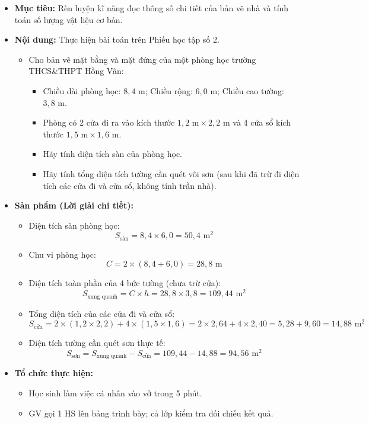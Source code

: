 \documentclass[12pt, a4paper]{article}
\begin{document}
\begin{itemize}[leftmargin=1.2cm]
    \item[a)] \textbf{Mục tiêu:} Rèn luyện kĩ năng đọc thông số chi tiết của bản vẽ nhà và tính toán số lượng vật liệu cơ bản.
    \item[b)] \textbf{Nội dung:} Thực hiện bài toán trên Phiếu học tập số 2.
    \begin{itemize}[leftmargin=0.6cm]
        \item Cho bản vẽ mặt bằng và mặt đứng của một phòng học trường THCS\&THPT Hồng Vân:
        \begin{itemize}
            \item Chiều dài phòng học: $8{,}4\text{ m}$; Chiều rộng: $6{,}0\text{ m}$; Chiều cao tường: $3{,}8\text{ m}$.
            \item Phòng có 2 cửa đi ra vào kích thước $1{,}2\text{ m} \times 2{,}2\text{ m}$ và 4 cửa sổ kích thước $1{,}5\text{ m} \times 1{,}6\text{ m}$.
            \item Hãy tính diện tích sàn của phòng học.
            \item Hãy tính tổng diện tích tường cần quét vôi sơn (sau khi đã trừ đi diện tích các cửa đi và cửa sổ, không tính trần nhà).
        \end{itemize}
    \end{itemize}

    \item[c)] \textbf{Sản phẩm (Lời giải chi tiết):}
    \begin{itemize}[leftmargin=0.6cm]
        \item Diện tích sàn phòng học:
        $$S_{\text{sàn}} = 8{,}4 \times 6{,}0 = 50{,}4\text{ m}^2$$
        \item Chu vi phòng học:
        $$C = 2 \times (8{,}4 + 6{,}0) = 28{,}8\text{ m}$$
        \item Diện tích toàn phần của 4 bức tường (chưa trừ cửa):
        $$S_{\text{xung quanh}} = C \times h = 28{,}8 \times 3{,}8 = 109{,}44\text{ m}^2$$
        \item Tổng diện tích của các cửa đi và cửa sổ:
        $$S_{\text{cửa}} = 2 \times (1{,}2 \times 2{,}2) + 4 \times (1{,}5 \times 1{,}6) = 2 \times 2{,}64 + 4 \times 2{,}40 = 5{,}28 + 9{,}60 = 14{,}88\text{ m}^2$$
        \item Diện tích tường cần quét sơn thực tế:
        $$S_{\text{sơn}} = S_{\text{xung quanh}} - S_{\text{cửa}} = 109{,}44 - 14{,}88 = 94{,}56\text{ m}^2$$
    \end{itemize}

    \item[d)] \textbf{Tổ chức thực hiện:}
    \begin{itemize}[leftmargin=0.6cm]
        \item Học sinh làm việc cá nhân vào vở trong 5 phút.
        \item GV gọi 1 HS lên bảng trình bày; cả lớp kiểm tra đối chiếu kết quả.
    \end{itemize}
\end{itemize}
\end{document}
